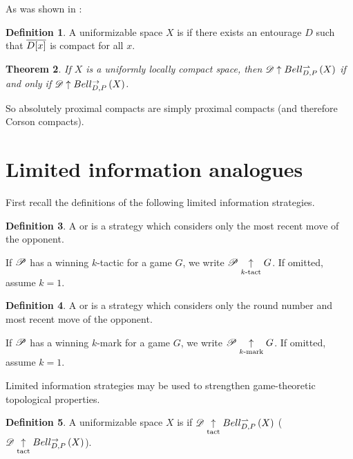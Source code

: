 \documentclass{amsart}
\newtheorem{theorem}{Theorem}[section]
\theoremstyle{definition}
\newtheorem{definition}[theorem]{Definition}
\begin{document}
  As was shown in \cite{MR3227201}:

  \begin{definition}
    A uniformizable space \(X\) is  if there
    exists an entourage \(D\) such that \(\overline{D[x]}\) is compact
    for all \(x\).
  \end{definition}

  \begin{theorem}\label{uniformlyLocallyCompact}
    If \(X\) is a uniformly locally compact space, then
    \(\mathscr{D} \uparrow Bell_{D,P}^{\rightharpoonup}\left({X}\right)\) if and only if
    \(\mathscr{D} \uparrow Bell_{D,P}^{\to}\left({X}\right)\).
  \end{theorem}

  So absolutely proximal compacts are simply proximal compacts (and therefore
  Corson compacts).


\section{Limited information analogues}

  First recall the definitions of the following limited information strategies.

  \begin{definition}
    A  or 
    is a strategy which considers only the most recent move of the opponent.

    If \(\mathscr{P}\) has a winning \(k\)-tactic for a game \(G\), we write
    \(\mathscr{P}\underset{k\text{-tact}}{\uparrow} G\). If omitted, assume \(k=1\).
  \end{definition}

  \begin{definition}
    A  or  is a strategy
    which considers only the round number and most recent move of the
    opponent.

    If \(\mathscr{P}\) has a winning \(k\)-mark for a game \(G\), we write
    \(\mathscr{P}\underset{k\text{-mark}}{\uparrow} G\). If omitted, assume \(k=1\).
  \end{definition}

  Limited information strategies may be used to strengthen game-theoretic
  topological properties.

  \begin{definition}
    A uniformizable space \(X\) is  if
    \(\mathscr{D} \underset{\text{tact}}{\uparrow} Bell_{D,P}^{\rightharpoonup}\left({X}\right)\) (\(\mathscr{D} \underset{\text{tact}}{\uparrow} Bell_{D,P}^{\to}\left({X}\right)\)).
  \end{definition}
\end{document}

